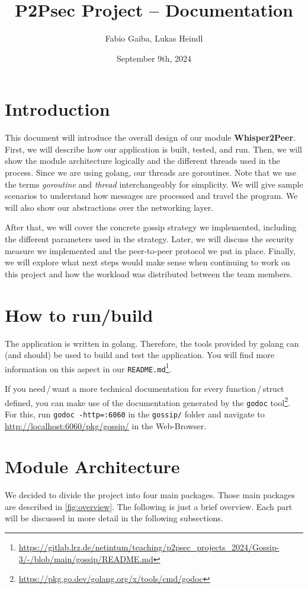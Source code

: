 \documentclass[a4paper,english,10pt,NET]{tumarticle}
\title{P2Psec Project -- Documentation}
\author{Fabio Gaiba, Lukas Heindl}
\date{September 9th, 2024}
\begin{document}
\maketitle
\thispagestyle{tumarticle}

\section{Introduction}
This document will introduce the overall design of our module \textbf{Whisper2Peer}.
First, we will describe how our application is built, tested, and run.
Then, we will show the module architecture logically and the different threads used in the process.
Since we are using golang, our threads are goroutines.
Note that we use the terms \emph{goroutine} and \emph{thread} interchangeably for simplicity.
We will give sample scenarios to understand how messages are processed and travel the program.
We will also show our abstractions over the networking layer.

After that, we will cover the concrete gossip strategy we implemented, including the different parameters used in the strategy.
Later, we will discuss the security measure we implemented and the peer-to-peer protocol we put in place.
Finally, we will explore what next steps would make sense when continuing to work on this project and how the workload was distributed between the team members.

\section{How to run/build}
The application is written in golang.
Therefore, the tools provided by golang can (and should) be used to build and test the application.
You will find more information on this aspect in our \texttt{README.md}\footnote{\url{https://gitlab.lrz.de/netintum/teaching/p2psec_projects_2024/Gossip-3/-/blob/main/gossip/README.md}}.

If you need\,/\,want a more technical documentation for every function\,/\,struct defined, you can make use of the documentation generated by the \texttt{godoc} tool\footnote{\url{https://pkg.go.dev/golang.org/x/tools/cmd/godoc}}.
For this, run \lstinline{godoc -http=:6060} in the \texttt{gossip/} folder and navigate to \url{http://localhost:6060/pkg/gossip/} in the Web-Browser.

\section{Module Architecture}
We decided to divide the project into four main packages.
Those main packages are described in \cref{fig:overview}.
The following is just a brief overview.
Each part will be discussed in more detail in the following subsections.
\end{document}
